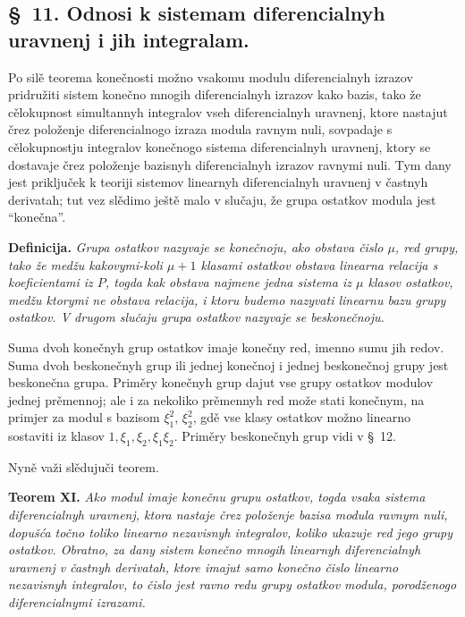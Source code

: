 \documentclass[11pt]{article}
\begin{document}

\setcounter{footnote}{23}
\subsection*{\S~11. Odnosi k sistemam diferencialnyh uravnenj i jih integralam.}

Po silě teorema konečnosti možno vsakomu modulu diferencialnyh izrazov pridružiti sistem konečno mnogih diferencialnyh izrazov kako bazis, tako že cělokupnost simultannyh integralov vseh diferencialnyh uravnenj, ktore nastajut črez položenje diferencialnogo izraza modula ravnym nuli, sovpadaje s cělokupnostju integralov konečnogo sistema diferencialnyh uravnenj, ktory se dostavaje črez položenje bazisnyh diferencialnyh izrazov ravnymi nuli. Tym dany jest priključek k teoriji sistemov linearnyh diferencialnyh uravnenj v častnyh derivatah; tut vez slědimo ještě malo v slučaju, že grupa ostatkov modula jest ``konečna''.

\textbf{Definicija.} \textit{Grupa ostatkov nazyvaje se konečnoju, ako obstava čislo \(\mu\), red grupy, tako že medžu kakovymi-koli \(\mu+1\) klasami ostatkov obstava linearna relacija s koeficientami iz \(P\), togda kak obstava najmene jedna sistema iz \(\mu\) klasov ostatkov, medžu ktorymi ne obstava relacija, i ktoru budemo nazyvati linearnu bazu grupy ostatkov. V drugom slučaju grupa ostatkov nazyvaje se beskonečnoju.}

Suma dvoh konečnyh grup ostatkov imaje konečny red, imenno sumu jih redov. Suma dvoh beskonečnyh grup ili jednej konečnoj i jednej beskonečnoj grupy jest beskonečna grupa. Priměry konečnyh grup dajut vse grupy ostatkov modulov jednej prěmennoj; ale i za nekoliko prěmennyh red može stati konečnym, na primjer za modul s bazisom \(\xi_1^2\), \(\xi_2^2\), gdě vse klasy ostatkov možno linearno sostaviti iz klasov \(1,\xi_1,\xi_2,\xi_1\xi_2\). Priměry beskonečnyh grup vidi v \S~12.

Nyně važi slědujuči teorem.

\textbf{Teorem XI.} \textit{Ako modul imaje konečnu grupu ostatkov, togda vsaka sistema diferencialnyh uravnenj, ktora nastaje črez položenje bazisa modula ravnym nuli, dopušća točno toliko linearno nezavisnyh integralov, koliko ukazuje red jego grupy ostatkov. Obratno, za dany sistem konečno mnogih linearnyh diferencialnyh uravnenj v častnyh derivatah, ktore imajut samo konečno čislo linearno nezavisnyh integralov, to čislo jest ravno redu grupy ostatkov modula, porodženogo diferencialnymi izrazami.}
\end{document}
